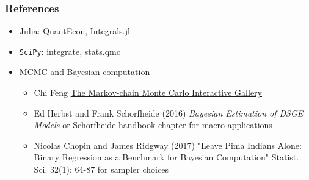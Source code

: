 \documentclass[bigger,handout]{beamer}
\begin{document}
\begin{frame}%

\frametitle{References}

\begin{itemize}

\item Julia: \href{https://julia.quantecon.org/more_julia/general_packages.html}{QuantEcon}, \href{https://github.com/SciML/Integrals.jl}{Integrals.jl}
\item \texttt{SciPy}: \href{https://docs.scipy.org/doc/scipy/reference/integrate.html}{integrate}, \href{https://docs.scipy.org/doc/scipy/reference/stats.qmc.html}{stats.qmc}

\item MCMC and Bayesian computation
\begin{itemize}
\item Chi Feng \href{https://chi-feng.github.io/mcmc-demo/}{The Markov-chain Monte Carlo Interactive Gallery}
\item Ed Herbst and Frank Schorfheide (2016) \emph{Bayesian Estimation of DSGE Models} or Schorfheide handbook chapter for macro applications
\item Nicolas Chopin and James Ridgway (2017) "Leave Pima Indians Alone: Binary Regression as a Benchmark for Bayesian Computation"  Statist. Sci. 32(1): 64-87 for sampler choices
\end{itemize}

\end{itemize}


\end{frame}%
\end{document}
